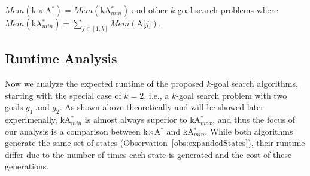 \documentclass{aicom2e}
\newcommand{\kgs}{$k$-goal search}
\newcommand{\kastarmin}{kA$^*_{min}$}
\newcommand{\kastarmax}{kA$^*_{max}$}
\newcommand{\kxastar}{k$\times$A$^*$}
\newcommand{\astari}[1]{A[$#1$]}
\begin{document}
$Mem(\text{\kxastar{}}) = Mem(\text{\kastarmin{}})$ and other \kgs{} problems where 
$Mem(\text{\kastarmin{}}) = \sum_{j\in[1,k]} Mem(\text{\astari{j}})$. 



\subsection{Runtime Analysis}
Now we analyze the expected runtime of the proposed \kgs{} algorithms, starting with the special case of $k=2$, 
i.e., a \kgs{} problem with two goals $g_1$ and $g_2$. As shown above theoretically 
and will be showed later experimenally, \kastarmin{} is almost always superior to \kastarmax{}, 
and thus the focus of our analysis is a comparison between \kxastar{} and \kastarmin{}. 
While both algorithms generate the same set of states (Observation~\ref{obs:expandedStates}), 
their runtime differ due to the number of times each state is generated and the cost of these generations. 
\end{document}
